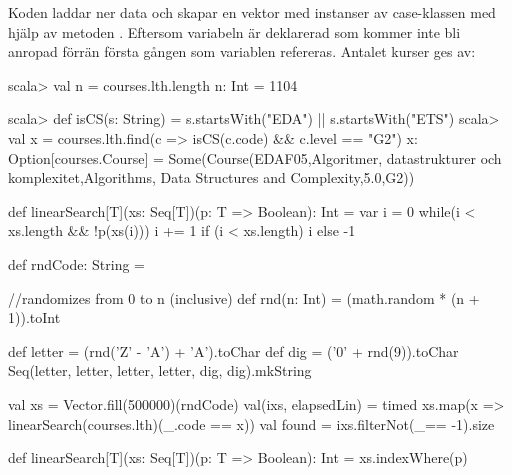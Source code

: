 \SubtaskSolved
Koden laddar ner data och skapar en vektor med instanser av case-klassen  med hjälp av metoden . Eftersom variabeln  är deklarerad som  kommer inte  bli anropad förrän första gången som variablen  refereras. Antalet kurser ges av:
\begin{REPLnonum}
scala> val n = courses.lth.length
n: Int = 1104
\end{REPLnonum}

\SubtaskSolved
\begin{REPL}
scala> def isCS(s: String) = s.startsWith("EDA") || s.startsWith("ETS")
scala> val x = courses.lth.find(c => isCS(c.code) && c.level == "G2")
x: Option[courses.Course] = Some(Course(EDAF05,Algoritmer, datastrukturer och
   komplexitet,Algorithms, Data Structures and Complexity,5.0,G2))
\end{REPL}

\SubtaskSolved
\begin{Code}
def linearSearch[T](xs: Seq[T])(p: T => Boolean): Int = {
   var i = 0
   while(i < xs.length && !p(xs(i))) i += 1
   if (i < xs.length) i else -1
}
\end{Code}

\SubtaskSolved

\begin{Code}
def rndCode: String = {
   //randomizes from 0 to n (inclusive)
   def rnd(n: Int) = (math.random * (n + 1)).toInt

   def letter = (rnd('Z' - 'A') + 'A').toChar
   def dig = ('0' + rnd(9)).toChar
   Seq(letter, letter, letter, letter, dig, dig).mkString
}
\end{Code}

\SubtaskSolved

\begin{Code}
val xs = Vector.fill(500000)(rndCode)
val(ixs, elapsedLin) =
  timed { xs.map(x => linearSearch(courses.lth)(_.code == x)) }
val found = ixs.filterNot(_== -1).size
\end{Code}

\SubtaskSolved

\begin{Code}
def linearSearch[T](xs: Seq[T])(p: T => Boolean): Int = xs.indexWhere(p)
\end{Code}



\QUESTEND


